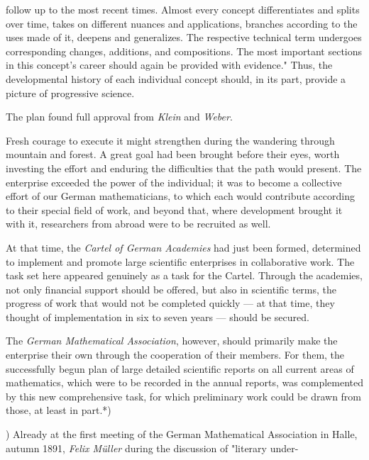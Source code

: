 \thispagestyle{fancy}

\vspace{0.5cm}

follow up to the most recent times. Almost every concept differentiates and splits over time, takes on different nuances and applications, branches according to the uses made of it, deepens and generalizes. The respective technical term undergoes corresponding changes, additions, and compositions. The most important sections in this concept's career should again be provided with evidence." Thus, the developmental history of each individual concept should, in its part, provide a picture of progressive science.

The plan found full approval from \textit{Klein} and \textit{Weber}.

Fresh courage to execute it might strengthen during the wandering through mountain and forest. A great goal had been brought before their eyes, worth investing the effort and enduring the difficulties that the path would present. The enterprise exceeded the power of the individual; it was to become a collective effort of our German mathematicians, to which each would contribute according to their special field of work, and beyond that, where development brought it with it, researchers from abroad were to be recruited as well.

At that time, the \textit{Cartel of German Academies} had just been formed, determined to implement and promote large scientific enterprises in collaborative work. The task set here appeared genuinely as a task for the Cartel. Through the academies, not only financial support should be offered, but also in scientific terms, the progress of work that would not be completed quickly — at that time, they thought of implementation in six to seven years — should be secured.

The \textit{German Mathematical Association}, however, should primarily make the enterprise their own through the cooperation of their members. For them, the successfully begun plan of large detailed scientific reports on all current areas of mathematics, which were to be recorded in the annual reports, was complemented by this new comprehensive task, for which preliminary work could be drawn from those, at least in part.*)

\vfill
\leftline{\rule{2in}{0.4pt}}
\vspace{0.2cm}
{
\footnotesize *) Already at the first meeting of the German Mathematical Association in Halle, autumn 1891, \textit{Felix Müller} during the discussion of "literary under-

}
